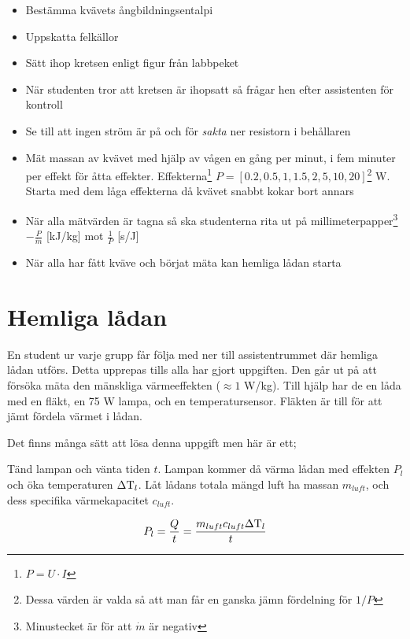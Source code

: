\documentclass[11pt]{article}
\begin{document}
\begin{itemize}
    \item Bestämma kvävets ångbildningsentalpi
    \item Uppskatta felkällor
    \item Sätt ihop kretsen enligt figur från labbpeket
    \item När studenten tror att kretsen är ihopsatt så frågar hen efter assistenten för kontroll
    \item Se till att ingen ström är på och för \emph{sakta} ner resistorn i behållaren
    \item Mät massan av kvävet med hjälp av vågen en gång per minut, i fem minuter per effekt för åtta effekter. Effekterna\footnote{$P = U \cdot I$} $P = [0.2, 0.5, 1, 1.5, 2, 5, 10, 20]$\footnote{Dessa värden är valda så att man får en ganska jämn fördelning för $1/P$} W. Starta med dem låga effekterna då kvävet snabbt kokar bort annars
    \item När alla mätvärden är tagna så ska studenterna rita ut på millimeterpapper\footnote{Minustecket är för att $\dot m$ är negativ} $- \frac{P}{\dot m}$ [kJ/kg] mot $\frac{1}{P}$ [s/J]
    \item När alla har fått kväve och börjat mäta kan hemliga lådan starta
\end{itemize}

\section{Hemliga lådan}

En student ur varje grupp får följa med ner till assistentrummet där hemliga lådan utförs. Detta upprepas tills alla har gjort uppgiften. Den går ut på att försöka mäta den mänskliga värmeeffekten ($\approx 1$ W/kg). Till hjälp har de en låda med en fläkt, en 75 W lampa, och en temperatursensor. Fläkten är till för att jämt fördela värmet i lådan.

Det finns många sätt att lösa denna uppgift men här är ett;

Tänd lampan och vänta tiden $t$. Lampan kommer då värma lådan med effekten $P_l$ och öka temperaturen $\Delta \text T_l$. Låt lådans totala mängd luft ha massan $m_{luft}$, och dess specifika värmekapacitet $c_{luft}$.

\begin{equation*}
    P_l = \frac{Q}{t} = \frac{m_{luft} c_{luft} \Delta \text T_l}{t}
\end{equation*}
\end{document}
